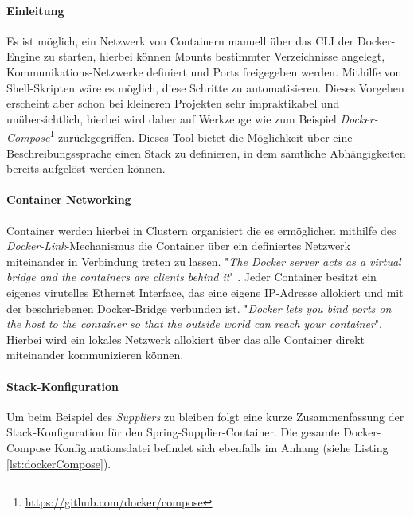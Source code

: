\paragraph{Einleitung \checkmark}
Es ist möglich, ein Netzwerk von Containern manuell über das CLI der Docker-Engine zu starten, hierbei können Mounts bestimmter Verzeichnisse angelegt, Kommunikations-Netzwerke definiert und Ports freigegeben werden. Mithilfe von Shell-Skripten wäre es möglich, diese Schritte zu automatisieren. Dieses Vorgehen erscheint aber schon bei kleineren Projekten sehr impraktikabel und unübersichtlich, hierbei wird daher auf Werkzeuge wie zum Beispiel \emph{Docker-Compose}\footnote{\url{https://github.com/docker/compose}} zurückgegriffen. Dieses Tool bietet die Möglichkeit über eine Beschreibungssprache einen Stack zu definieren, in dem sämtliche Abhängigkeiten bereits aufgelöst werden können. 

\paragraph{Container Networking \checkmark}
Container werden hierbei in Clustern organisiert die es ermöglichen mithilfe des \emph{Docker-Link}-Mechanismus die Container über ein definiertes Netzwerk miteinander in Verbindung treten zu lassen. "\emph{The Docker server acts as a virtual bridge and the containers are clients behind it}" \cite[Seite~13]{oreilly-docker}. Jeder Container besitzt ein eigenes virutelles Ethernet Interface, das eine eigene IP-Adresse allokiert und mit der beschriebenen Docker-Bridge verbunden ist. "\emph{Docker lets you bind ports on the host to the container so that the outside world can reach your container}". Hierbei wird ein lokales Netzwerk allokiert über das alle Container direkt miteinander kommunizieren können.

\paragraph{Stack-Konfiguration \checkmark}
Um beim Beispiel des \emph{Suppliers} zu bleiben folgt eine kurze Zusammenfassung der Stack-Konfiguration für den Spring-Supplier-Container. Die gesamte Docker-Compose Konfigurationsdatei befindet sich ebenfalls im Anhang (siehe Listing \ref{lst:dockerCompose}).

